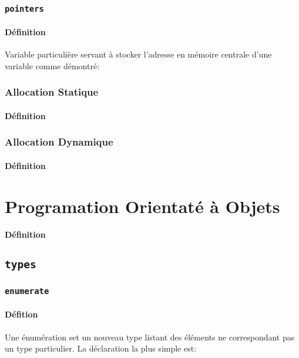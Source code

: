 \documentclass{article}
\begin{document}
\subsubsection{\texttt{pointers}}
\paragraph{Définition}Variable particulière servant à stocker l'adresse en mémoire centrale d'une variable comme démontré:
\begin{scriptsize}
    \myStyleCPP
    
\end{scriptsize}

\subsubsection{Allocation Statique}
\paragraph{Définition}

\subsubsection{Allocation Dynamique}
\paragraph{Définition}


\section{Programation Orientaté à Objets}
\paragraph{Définition}

\subsection{\texttt{types}}
\subsubsection{\texttt{enumerate}}
\paragraph{Défition}Une énumération set un nouveau type listant des éléments ne correspondant pas un type particulier. La déclaration la plus simple est:
\begin{scriptsize}
    \myStyleCPP
    
\end{scriptsize}
\end{document}
